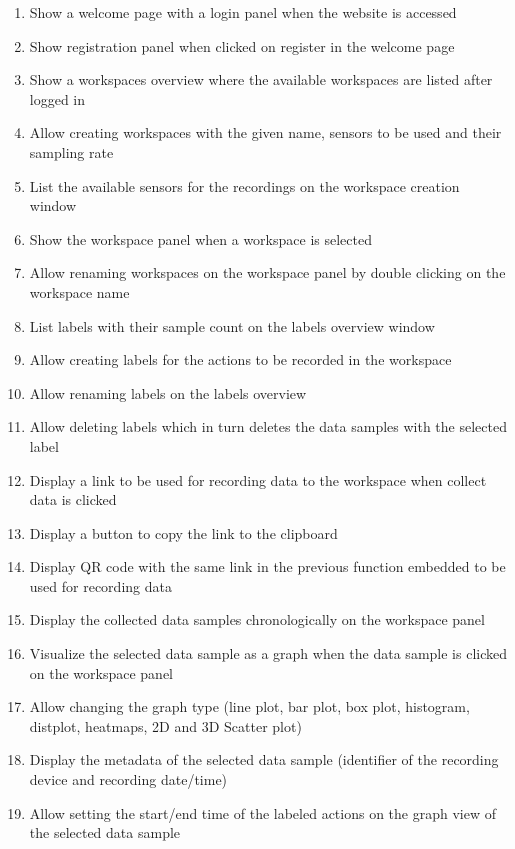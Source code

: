 \begin{enumerate}[{label = \textbf{/F{\protect\twodigits{\arabic{enumi}}}0/}, leftmargin = *}]
    \item \label{welcome_page} Show a welcome page with a login panel when the website is accessed
    \item \label{registration_panel}Show registration panel when clicked on register in the welcome page
    \item \label{workspaces_ov}Show a workspaces overview where the available workspaces are listed after logged in
    \item Allow creating workspaces with the given name, sensors to be used and their sampling rate
    \item List the available sensors for the recordings on the workspace creation window
    \item Show the workspace panel when a workspace is selected
    \item Allow renaming workspaces on the workspace panel by double clicking on the workspace name
    \item List labels with their sample count on the labels overview window
    \item Allow creating labels for the actions to be recorded in the workspace
    \item Allow renaming labels on the labels overview
    \item Allow deleting labels which in turn deletes the data samples with the selected label
    \item Display a link to be used for recording data to the workspace when collect data is clicked
    \item Display a button to copy the link to the clipboard
    \item Display QR code with the same link in the previous function embedded to be used for recording data
    \item Display the collected data samples chronologically on the workspace panel
    \item Visualize the selected data sample as a graph when the data sample is clicked on the workspace panel 
    \item Allow changing the graph type (line plot, bar plot, box plot, histogram, distplot, heatmaps, 2D and 3D Scatter plot)
    \item Display the metadata of the selected data sample (identifier of the recording device and recording date/time)
    \item Allow setting the start/end time of the labeled actions on the graph view of the selected data sample

\end{enumerate}
